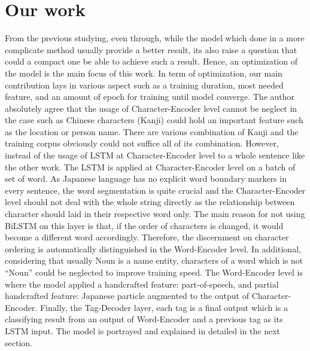 \section{Our work}
From the previous studying, even through, while the model which done in a more complicate method usually provide a better result, its also raise a question that could a compact one be able to achieve such a result.
Hence, an optimization of the model is the main focus of this work.
In term of optimization, our main contribution lays in various aspect such as a training duration, most needed feature, and an amount of epoch for training until model converge.
The author absolutely agree that the usage of Character-Encoder level cannot be neglect in the case such as Chinese characters (Kanji) could hold an important feature such as the location or person name.
There are various combination of Kanji and the training corpus obviously could not suffice all of its combination.
However, instead of the usage of LSTM at Character-Encoder level to a whole sentence like the other work.
The LSTM is applied at Character-Encoder level on a batch of set of word.
As Japanese language has no explicit word boundary markers in every sentence, the word segmentation is quite crucial and the Character-Encoder level should not deal with the whole string directly as the relationship between character should laid in their respective word only.
The main reason for not using BiLSTM on this layer is that, if the order of characters is changed, it would become a different word accordingly.
Therefore, the discernment on character ordering is automatically distinguished in the Word-Encoder level.
In additional, considering that usually Noun is a name entity, characters of a word which is not ``Noun'' could be neglected to improve training speed.
The Word-Encoder level is where the model applied a handcrafted feature: part-of-speech, and partial handcrafted feature: Japanese particle augmented to the output of Character-Encoder.
Finally, the Tag-Decoder layer, each tag is a final output which is a classifying result from an output of Word-Encoder and a previous tag as its LSTM input.
The model is portrayed and explained in detailed in the next section.

